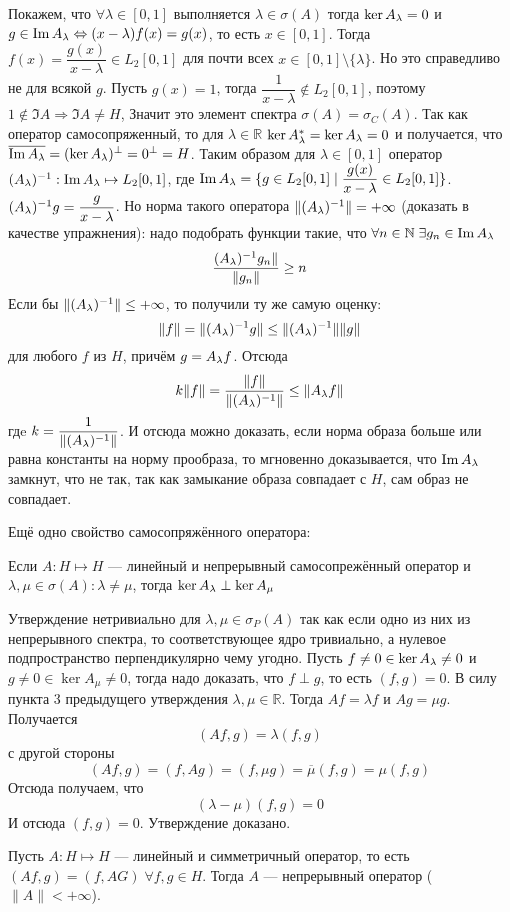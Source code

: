\documentclass[14pt]{extarticle}
\begin{document}
\begin{Prim}
    Покажем, что $\forall \lambda \in [0,1]$ выполняется $\lambda \in 
    \sigma(A)$ тогда $\ker \Al = 0$ и $g \in \Im \Al 
    \Leftrightarrow (x - \lambda)f(x) = g(x)$, то есть $x \in [0,1]$.
    Тогда $f(x) = \dfrac{g(x)}{x - \lambda} \in L_2[0,1]$ для почти всех $x \in 
    [0, 1] \setminus \{\lambda\}$.
    Но это справедливо не для всякой $g$.
    Пусть $g(x) = 1$, тогда $\dfrac{1}{x - \lambda} \notin L_2[0,1]$, поэтому 
    $1 \notin \Im A \Rightarrow \Im A \ne H$, 
    Значит это элемент спектра $\sigma(A) = \sigma_C(A)$.
    Так как оператор самосопряженный, то для $\lambda \in \mathbb R$ $\ker 
    \Al^* = \ker \Al = 0$ и получается, что
    $\overline{\Im \Al} = (\ker \Al)^\perp = 0^\perp = H$. 
    Таким образом для $\lambda \in [0,1]$ оператор $\Alo : \Im \Al \mapsto 
    L_2[0,1]$, где $\Im \Al = \{g \in L_2[0,1] \mid
    \dfrac{g(x)}{x - \lambda} \in L_2[0,1]\}$. 
    $(A_\lambda)^{-1} g = \dfrac{g}{x - \lambda}$.
    Но норма такого оператора $\|(A_\lambda)^{-1}\| = +\infty$ (доказать в качестве 
    упражнения): надо подобрать функции такие, что
    $\forall n \in \mathbb N\; \exists g_n \in \Im \Al$
    $$
    \dfrac{(A_\lambda)^{-1} g_n\|}{\|g_n\|} \ge n
    $$
    Если бы $\|(A_\lambda)^{-1}\| \le +\infty$, то получили ту же самую оценку:
    $$
    \|f\| = \|(A_\lambda)^{-1} g\| \le \|(A_\lambda)^{-1}\| \|g\|
    $$
    для любого $f$ из $H$, причём $g = \Al f$.
    Отсюда
    $$
    k\|f\| = \dfrac{\|f\|}{\|\Alo\|} \le \|\Al f\|
    $$
    гдe $k = \dfrac{1}{\|(A_\lambda)^{-1}\|}$.
    И отсюда можно доказать, если норма образа больше или равна константы на 
    норму прообраза, то мгновенно
    доказывается, что $\Im \Al$ замкнут, что не так, так как замыкание образа 
    совпадает с $H$, сам образ не совпадает.
\end{Prim}

Ещё одно свойство самосопряжённого оператора:
\begin{Utv}
    Если $A : H \mapsto H$ --- линейный и непрерывный самосопрежённый оператор 
    и $\lambda, \mu \in \sigma(A)\colon
    \lambda \ne \mu$, тогда $\ker \Al \perp \ker A_\mu$
\end{Utv}
\begin{Proof}
    Утверждение нетривиально для $\lambda, \mu \in \sigma_P(A)$ так как если 
    одно из них из непрерывного спектра, то
    соответствующее ядро тривиально, а нулевое подпространство перпендикулярно 
    чему угодно.
    Пусть $f \ne 0 \in \ker \Al \ne 0$ и $g \ne 0 \in \ker A_\mu \ne 0$, тогда 
    надо доказать, что $f \perp g$, то есть $(f, g) = 0$.
    В силу пункта 3 предыдущего утверждения $\lambda, \mu \in \mathbb R$.
    Тогда $A f = \lambda f$ и $A g = \mu g$.
    Получается
    $$
    (Af, g) = \lambda (f, g)
    $$
    с другой стороны
    $$
    (Af, g) = (f, Ag) = (f, \mu g) = \overline{\mu}(f, g) = \mu (f, g)
    $$
    Отсюда получаем, что
    $$
    (\lambda - \mu)(f, g) = 0
    $$
    И отсюда $(f, g) = 0$.
    Утверждение доказано.
\end{Proof}
\begin{Upr}
    Пусть $A : H \mapsto H$ --- линейный и симметричный оператор, то есть $(Af 
    ,g) = (f, AG)\; \forall f,g \in H$.
    Тогда $A$ --- непрерывный оператор ($\|A\| < +\infty$).
\end{Upr}
\end{document}
